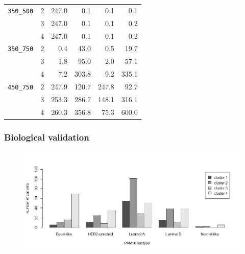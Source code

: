 \documentclass[conference]{IEEEtran}
\begin{document}
\begin{table}
\begin{tabular}{|ll|rr|rr|}
\hline
\texttt{350\_500} & 2 &     247.0 &     0.1 &       0.1 &     0.1 \\
         & 3 &     247.0 &     0.1 &       0.1 &     0.2 \\
         & 4 &     247.0 &     0.1 &       0.1 &     0.2 \\
\hline
\texttt{350\_750} & 2 &       0.4 &    43.0 &       0.5 &    19.7 \\
         & 3 &       1.8 &    95.0 &       2.0 &    57.1 \\
         & 4 &       7.2 &   303.8 &       9.2 &   335.1 \\
\hline
\texttt{450\_750} & 2 &     247.9 &   120.7 &     247.8 &    92.7 \\
         & 3 &     253.3 &   286.7 &     148.1 &   316.1 \\
         & 4 &     260.3 &   356.8 &      75.3 &       600.0  \\
\hline
\end{tabular}
\end{table}

\subsubsection{Biological validation}

\begin{figure}
\centering
\includegraphics[scale=0.33]{images/Plot_clusters_per_subtype_4Groups.jpeg}
\captionsetup{font=small}
\label{fig:plot_clusters_subtype}
\end{figure}
\end{document}

